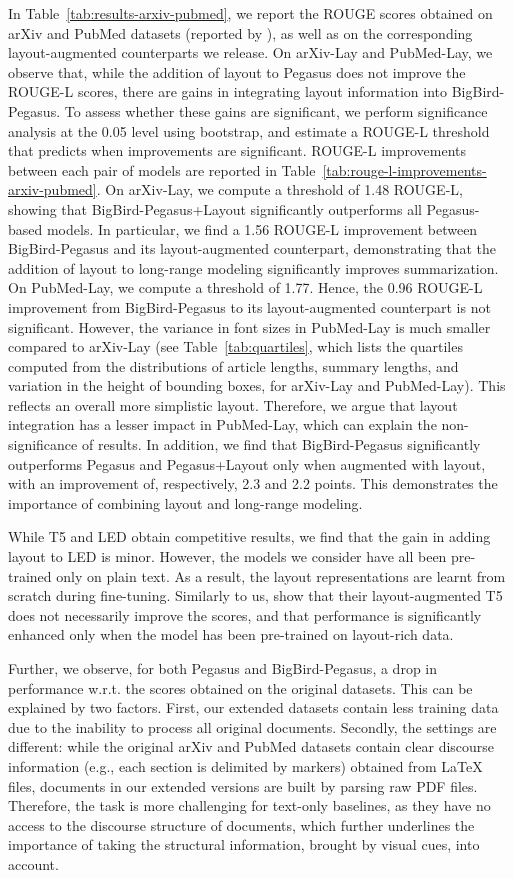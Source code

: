 In Table~\ref{tab:results-arxiv-pubmed}, we report the ROUGE scores obtained on arXiv and PubMed datasets (reported by \citet{zaheer2020big}), as well as on the corresponding layout-augmented counterparts we release. On arXiv-Lay and PubMed-Lay, we observe that, while the addition of layout to Pegasus does not improve the ROUGE-L scores, there are gains in integrating layout information into BigBird-Pegasus. To assess whether these gains are significant, we perform significance analysis at the 0.05 level using bootstrap, and estimate a ROUGE-L threshold that predicts when improvements are significant. ROUGE-L improvements between each pair of models are reported in Table~\ref{tab:rouge-l-improvements-arxiv-pubmed}. On arXiv-Lay, we compute a threshold of 1.48 ROUGE-L, showing that BigBird-Pegasus+Layout significantly outperforms all Pegasus-based models. In particular, we find a 1.56 ROUGE-L improvement between BigBird-Pegasus and its layout-augmented counterpart, demonstrating that the addition of layout to long-range modeling significantly improves summarization. On PubMed-Lay, we compute a threshold of 1.77. Hence, the 0.96 ROUGE-L improvement from BigBird-Pegasus to its layout-augmented counterpart is not significant. However, the variance in font sizes in PubMed-Lay is much smaller compared to arXiv-Lay (see Table~\ref{tab:quartiles}, which lists the quartiles computed from the distributions of article lengths, summary lengths, and variation in the height of bounding boxes, for arXiv-Lay and PubMed-Lay). This reflects an overall more simplistic layout. Therefore, we argue that layout integration has a lesser impact in PubMed-Lay, which can explain the non-significance of results. In addition, we find that BigBird-Pegasus significantly outperforms Pegasus and Pegasus+Layout only when augmented with layout, with an improvement of, respectively, 2.3 and 2.2 points. This demonstrates the importance of combining layout and long-range modeling. 

While T5 and LED obtain competitive results, we find that the gain in adding layout to LED is minor. However, the models we consider have all been pre-trained only on plain text. As a result, the layout representations are learnt from scratch during fine-tuning. Similarly to us, \citet{borchmann2021due} show that their layout-augmented T5 does not necessarily improve the scores, and that performance is significantly enhanced only when the model has been pre-trained on layout-rich data.  

Further, we observe, for both Pegasus and BigBird-Pegasus, a drop in performance w.r.t. the scores obtained on the original datasets. This can be explained by two factors. First, our extended datasets contain less training data due to the inability to process all original documents. Secondly, the settings are different: while the original arXiv and PubMed datasets contain clear discourse information (e.g., each section is delimited by markers) obtained from \LaTeX~ files, documents in our extended versions are built by parsing raw PDF files. Therefore, the task is more challenging for text-only baselines, as they have no access to the discourse structure of documents, which further underlines the importance of taking the structural information, brought by visual cues, into account.


